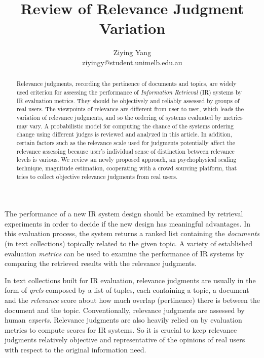\documentclass{article}
\title{\Large{\textbf{Review of Relevance Judgment Variation}}} %
\author{Ziying Yang\\\small{ziyingy@student.unimelb.edu.au}\\}
\begin{document}
\maketitle

\begin{abstract}
   Relevance judgments, recording the pertinence of documents and topics, are widely used criterion for assessing the performance of \textit{Information Retrieval} (IR) systems by IR evaluation metrics. They should be objectively and reliably assessed by groups of real users. The viewpoints of relevance are different from user to user, which leads the variation of relevance judgments, and so the ordering of systems evaluated by metrics may vary. A probabilistic model for computing the chance of the systems ordering change using different judges is reviewed and analyzed in this article. In addition, certain factors such as the relevance scale used for judgments  potentially affect the relevance assessing because user's individual sense of distinction between relevance levels is various. We review an newly proposed approach, an psychophysical scaling technique, magnitude estimation, cooperating with a crowd sourcing platform, that tries to collect objective relevance judgments from real users.\\

\end{abstract}


 The performance of a new IR system design should be examined by retrieval experiments in order to decide if the new design has meaningful advantages. In this evaluation process, the system returns a ranked list containing the \textit{documents} (in text collections) topically related to the given topic. A variety of established evaluation \textit{metrics} can be used to examine the performance of IR systems by comparing the retrieved results with the relevance judgments. 

 In text collections built for IR evaluation, relevance judgments are usually in the form of \textit{qrels} composed by a list of tuples, each containing a topic, a document and the \textit{relevance} score about how much overlap (pertinence) there is between the document and the topic. Conventionally, relevance judgments are assessed by human \textit{experts}. Relevance judgments are also heavily relied on by evaluation metrics to compute scores for IR systems. So it is crucial to keep relevance judgments relatively objective and representative of the opinions of real users with respect to the original information need. 
\end{document}
